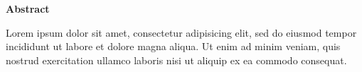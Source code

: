 
\clearpage
{}
{}
\begin{adjustwidth}{0.1\textwidth}{0.1\textwidth}
\begingroup
\null\vspace{0.2\textheight}
\begin{center}
{\bfseries\Large Abstract}\par\vspace{2em}

Lorem ipsum dolor sit amet, consectetur adipisicing elit, sed do eiusmod tempor incididunt ut labore et dolore magna aliqua. Ut enim ad minim veniam, quis nostrud exercitation ullamco laboris nisi ut aliquip ex ea commodo consequat.
\end{center}
\endgroup
\end{adjustwidth}
\clearpage